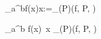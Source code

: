 \int_a^bf(x)x:=\lim_{\lambda(P)}\sigma(f, P, \xi)

\int_a^b f(x) \,x \coloneqq \lim_{\lambda(P)}\sigma(f, P, \xi)
